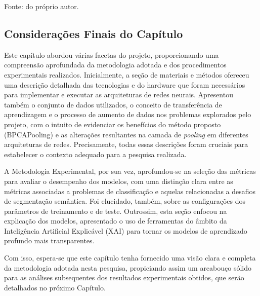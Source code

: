 \begin{table}[H]
    \vspace*{1cm}
    Fonte: do próprio autor.
\end{table}

\subsection{Considerações Finais do Capítulo}
\label{project:final}
 Este capítulo abordou várias facetas do projeto, proporcionando uma compreensão aprofundada da metodologia adotada e dos procedimentos experimentais realizados. Inicialmente, a seção de materiais e métodos ofereceu uma descrição detalhada das tecnologias e do hardware que foram necessários para implementar e executar as arquiteturas de redes neurais. Apresentou também o conjunto de dados utilizados, o conceito de transferência de aprendizagem e o processo de aumento de dados nos problemas explorados pelo projeto, com o intuito de evidenciar os benefícios do método proposto (BPCAPooling) e as alterações resultantes na camada de \textit{pooling} em diferentes arquiteturas de redes. Precisamente, todas essas descrições foram cruciais para estabelecer o contexto adequado para a pesquisa realizada.

A Metodologia Experimental, por sua vez, aprofundou-se na seleção das métricas para avaliar o desempenho dos modelos, com uma distinção clara entre as métricas associadas a problemas de classificação e aquelas relacionadas a desafios de segmentação semântica. Foi elucidado, também, sobre as configurações dos parâmetros de treinamento e de teste. Outrossim, esta seção enfocou na explicação dos modelos, apresentado o uso de ferramentas do âmbito da Inteligência Artificial Explicável (XAI) para tornar os modelos de aprendizado profundo mais transparentes.


Com isso, espera-se que este capítulo tenha fornecido uma visão clara e completa da metodologia adotada nesta pesquisa, propiciando assim um arcabouço sólido para as análises subsequentes dos resultados experimentais obtidos, que serão detalhados no próximo Capítulo.